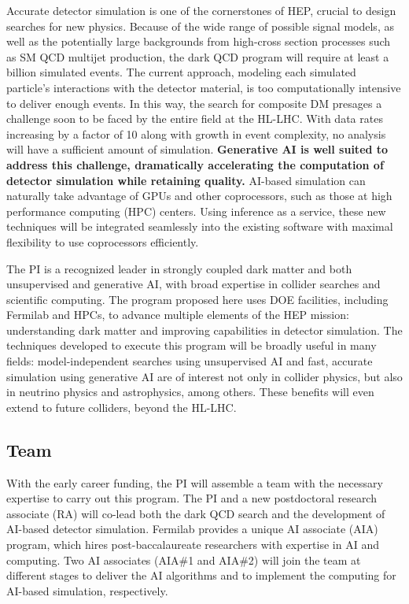 Accurate detector simulation is one of the cornerstones of HEP, crucial to design searches for new physics.
Because of the wide range of possible signal models,
as well as the potentially large backgrounds from high-cross section processes such as SM QCD multijet production,
the dark QCD program will require at least a billion simulated events.
The current approach, modeling each simulated particle's interactions with the detector material, is too computationally intensive to deliver enough events.
In this way, the search for composite DM presages a challenge soon to be faced by the entire field at the HL-LHC.
With data rates increasing by a factor of 10 along with growth in event complexity, no analysis will have a sufficient amount of simulation.
\textbf{Generative AI is well suited to address this challenge, dramatically accelerating the computation of detector simulation while retaining quality.}
AI-based simulation can naturally take advantage of GPUs and other coprocessors, such as those at high performance computing (HPC) centers.
Using inference as a service, these new techniques will be integrated seamlessly into the existing software with maximal flexibility to use coprocessors efficiently.

The PI is a recognized leader in strongly coupled dark matter and both unsupervised and generative AI,
with broad expertise in collider searches and scientific computing.
The program proposed here uses DOE facilities, including Fermilab and HPCs, to advance multiple elements of the HEP mission:
understanding dark matter and improving capabilities in detector simulation.
The techniques developed to execute this program will be broadly useful in many fields:
model-independent searches using unsupervised AI and fast, accurate simulation using generative AI are of interest
not only in collider physics, but also in neutrino physics and astrophysics, among others.
These benefits will even extend to future colliders, beyond the HL-LHC.

\subsection{Team}\label{subsec:team}

With the early career funding, the PI will assemble a team with the necessary expertise to carry out this program.
The PI and a new postdoctoral research associate (RA) will co-lead both the dark QCD search and the development of AI-based detector simulation.
Fermilab provides a unique AI associate (AIA) program, which hires post-baccalaureate researchers with expertise in AI and computing.
Two AI associates (AIA\#1 and AIA\#2) will join the team at different stages to deliver the AI algorithms and to implement the computing for AI-based simulation, respectively.

